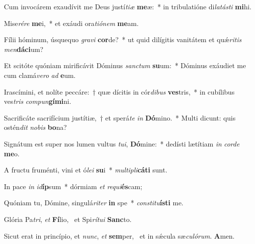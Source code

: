 \item Cum invocárem exaudívit me Deus justí\textit{ti}\textit{æ} \textbf{me}æ:~* in tribulatióne di\textit{la}\textit{tás}\textit{ti} \textbf{mi}hi.
\item Mise\textit{ré}\textit{re} \textbf{me}i,~* et exáudi ora\textit{ti}\textit{ó}\textit{nem} \textbf{me}am.
\item Fílii hóminum, úsquequo \textit{gra}\textit{vi} \textbf{cor}de?~* ut quid dilígitis vanitátem et quǽ\textit{ri}\textit{tis} \textit{men}\textbf{dá}\textbf{ci}um?
\item Et scitóte quóniam mirificávit Dóminus \textit{sanc}\textit{tum} \textbf{su}um:~* Dóminus exáudiet me cum clamá\textit{ve}\textit{ro} \textit{ad} \textbf{e}um.
\item Irascímini, et nolíte peccáre:~† quæ dícitis in cór\textit{di}\textit{bus} \textbf{ves}tris,~* in cubílibus ves\textit{tris} \textit{com}\textit{pun}\textbf{gí}\textbf{mi}ni.
\item Sacrificáte sacrifícium justítiæ,~† et sperá\textit{te} \textit{in} \textbf{Dó}mino.~* Multi dicunt: quis ostén\textit{dit} \textit{no}\textit{bis} \textbf{bo}na?
\item Signátum est super nos lumen vultus \textit{tu}\textit{i}, \textbf{Dó}mine:~* dedísti lætítiam \textit{in} \textit{cor}\textit{de} \textbf{me}o.
\item A fructu fruménti, vini et ó\textit{le}\textit{i} \textbf{su}i~* \textit{mul}\textit{ti}\textit{pli}\textbf{cá}\textbf{ti} sunt.
\item In pace \textit{in} \textit{id}\textbf{íp}sum~* dórmiam \textit{et} \textit{re}\textit{qui}\textbf{és}cam;
\item Quóniam tu, Dómine, singulá\textit{ri}\textit{ter} \textbf{in} spe~* \textit{con}\textit{sti}\textit{tu}\textbf{ís}\textbf{ti} me.
\item Glória Pa\textit{tri}, \textit{et} \textbf{Fí}lio,~\psstar{} et Spi\textit{rí}\textit{tu}\textit{i} \textbf{Sanc}to.
\item Sicut erat in princípio, et \textit{nunc}, \textit{et} \textbf{sem}per,~\psstar{} et in sǽcula sæ\textit{cu}\textit{ló}\textit{rum}. \textbf{A}men.
